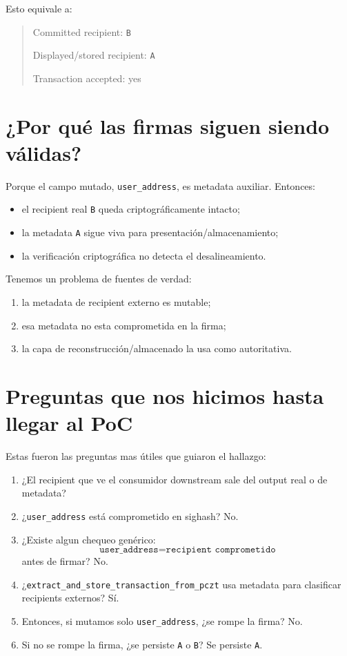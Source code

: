 \documentclass[11pt,a4paper]{article}
\begin{document}
Esto equivale a:

\begin{quote}
Committed recipient: \texttt{B}

Displayed/stored recipient: \texttt{A}

Transaction accepted: yes
\end{quote}

\section{¿Por qué las firmas siguen siendo válidas?}

Porque el campo mutado, \texttt{user\_address}, es metadata auxiliar. Entonces:

\begin{itemize}[leftmargin=2em]
    \item el recipient real \texttt{B} queda criptográficamente intacto;
    \item la metadata \texttt{A} sigue viva para presentación/almacenamiento;
    \item la verificación criptográfica no detecta el desalineamiento.
\end{itemize}

Tenemos un problema de fuentes de verdad:

\begin{enumerate}[leftmargin=2em]
	\item la metadata de recipient externo es mutable;
	\item esa metadata no esta comprometida en la firma;
	\item la capa de reconstrucción/almacenado la usa como autoritativa.
\end{enumerate}

\section{Preguntas que nos hicimos hasta llegar al PoC}

Estas fueron las preguntas mas útiles que guiaron el hallazgo:

\begin{enumerate}[leftmargin=2em]
    \item ¿El recipient que ve el consumidor downstream sale del output real o de metadata?
    \item ¿\texttt{user\_address} está comprometido en sighash? No.
    \item ¿Existe algun chequeo genérico:
    \[
    \texttt{user\_address} = \texttt{recipient comprometido}
    \]
    antes de firmar? No.
    \item ¿\texttt{extract\_and\_store\_transaction\_from\_pczt} usa metadata para clasificar recipients externos? Sí.
    \item Entonces, si mutamos solo \texttt{user\_address}, ¿se rompe la firma? No.
    \item Si no se rompe la firma, ¿se persiste \texttt{A} o \texttt{B}? Se persiste
    \texttt{A}.
\end{enumerate}
\end{document}
